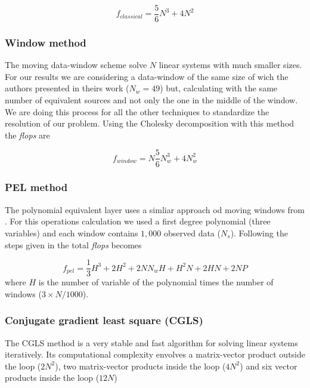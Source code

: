 \begin{equation}
	f_{classical} = \dfrac{5}{6} N^3 + 4N^2
\label{flops_classical}
\end{equation}

\subsubsection{Window method \citep{leao-silva1989}}

The moving data-window scheme \citep{leao-silva1989} solve $N$ linear systems with much smaller sizes. For our results we are considering a data-window of the same size of wich the authors presented in theirs work ($N_w = 49$) but, calculating with the same number of equivalent sources and not only the one in the middle of the window. We are doing this process for all the other techniques to standardize the resolution of our problem. Using the Cholesky decomposition with this method the \textit{flops} are

\begin{equation}
	f_{window} = N\dfrac{5}{6} N_w^3 + 4N_w^2
\label{flops_leao-silva}
\end{equation}

\subsubsection{PEL method \citep{oliveirajr-etal2013}}

The polynomial equivalent layer uses a simliar approach od moving windows from \cite{leao-silva1989}. For this operations calculation we used a first degree polynomial (three variables) and each window contains $1,000$ observed data ($N_s$). Following the steps given in \citep{oliveirajr-etal2013} the total \textit{flops} becomes

\begin{equation}
	f_{pel} = \dfrac{1}{3} H^3 + 2H^2 + 2NN_wH + H^2N + 2HN + 2NP
\label{flops_pel}
\end{equation}
where $H$ is the number of variable of the polynomial times the number of windows ($3 \times N/1000$).

\subsubsection{Conjugate gradient least square (CGLS)}

The CGLS method is a very stable and fast algorithm for solving linear systems iteratively. Its computational complexity envolves a matrix-vector product outside the loop ($2N^2$), two matrix-vector products inside the loop ($4N^2$) and six vector products inside the loop ($12N$)

